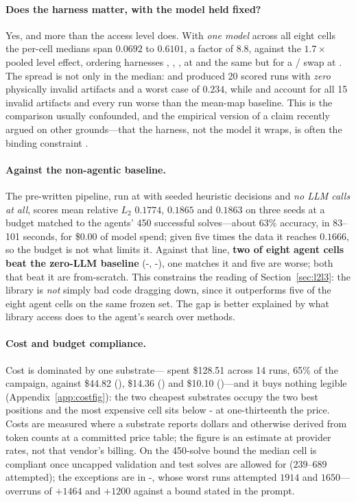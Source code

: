 \paragraph{Does the harness matter, with the model held fixed?}
\label{sec:harness-effect}
Yes, and more than the access level does. With \emph{one model} across all eight
cells the per-cell medians span $0.0692$ to $0.6101$, a factor of $8.8$, against
the $1.7\times$ pooled level effect, ordering harnesses , ,
,  at \Lthree{} and the same but for a /
swap at \Ltwo{}. The spread is not only in the median:  and 
produced 20 scored runs with \emph{zero} physically invalid artifacts and a
worst case of $0.234$, while  and  account for all 15 invalid
artifacts and every run worse than the mean-map baseline. This is the comparison
usually confounded, and the empirical version of a claim recently argued on
other grounds---that the harness, not the model it wraps, is often the binding
constraint \citep{zhang2026harness}.

\paragraph{Against the non-agentic baseline.}
\label{sec:vs-baseline}
The pre-written pipeline, run at \Lzero{} with seeded heuristic decisions and
\emph{no LLM calls at all}, scores mean relative $L_2$ $0.1774$, $0.1865$ and
$0.1863$ on three seeds at a budget matched to the agents' 450 successful
solves---about 63\% accuracy, in 83--101 seconds, for \$0.00 of model spend; given
five times the data it reaches $0.1666$, so the budget is not what limits it.
Against that line, \textbf{two of eight agent cells beat the zero-LLM baseline}
(\Lthree{}-, \Lthree{}-), one matches it and five are worse;
both that beat it are from-scratch. This constrains the reading of
Section~\ref{sec:l2l3}: the library is \emph{not} simply bad code dragging
\Ltwo{} down, since it outperforms five of the eight agent cells on the same
frozen set. The gap is better explained by what library access does to the
agent's search over methods.

\paragraph{Cost and budget compliance.}
\label{sec:cost}
Cost is dominated by one substrate--- spent \$128.51 across 14 runs,
65\% of the campaign, against \$44.82 (), \$14.36 () and
\$10.10 ()---and it buys nothing legible (Appendix~\ref{app:costfig}):
the two cheapest substrates occupy the two best positions and the most expensive
cell sits below \Lthree{}- at one-thirteenth the price. Costs are measured where a substrate reports dollars and otherwise derived from
token counts at a committed price table; the  figure is an estimate
at provider rates, not that vendor's billing. On the 450-solve bound the median cell is
compliant once uncapped validation and test solves are allowed for
($239$--$689$ attempted); the exceptions are in \Ltwo{}-, whose worst
runs attempted $1914$ and $1650$---overruns of $+1464$ and $+1200$ against a
bound stated in the prompt.
